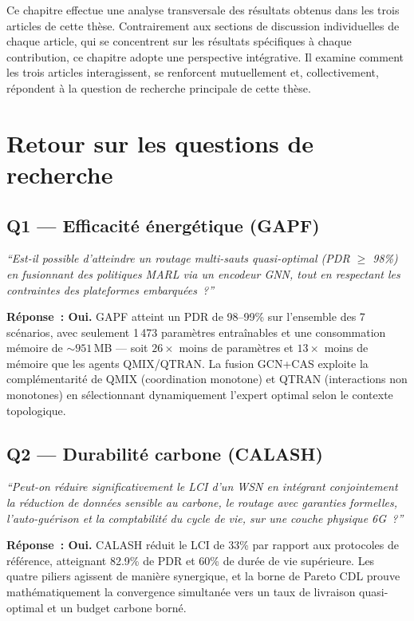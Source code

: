 \label{sec:Discussion}

Ce chapitre effectue une analyse transversale des résultats obtenus dans les trois articles de cette thèse. Contrairement aux sections de discussion individuelles de chaque article, qui se concentrent sur les résultats spécifiques à chaque contribution, ce chapitre adopte une perspective intégrative. Il examine comment les trois articles interagissent, se renforcent mutuellement et, collectivement, répondent à la question de recherche principale de cette thèse.


\section{Retour sur les questions de recherche}\label{sec:disc-retour-questions}

\subsection{Q1 --- Efficacité énergétique (GAPF)}

\noindent\textit{``Est-il possible d'atteindre un routage multi-sauts quasi-optimal (PDR $\geq$ 98\%) en fusionnant des politiques MARL via un encodeur GNN, tout en respectant les contraintes des plateformes embarquées~?''}

\medskip
\noindent\textbf{Réponse~: Oui.} GAPF atteint un PDR de 98--99\% sur l'ensemble des 7 scénarios, avec seulement 1\,473 paramètres entraînables et une consommation mémoire de ${\sim}951$\,MB --- soit $26\times$ moins de paramètres et $13\times$ moins de mémoire que les agents QMIX/QTRAN. La fusion GCN+CAS exploite la complémentarité de QMIX (coordination monotone) et QTRAN (interactions non monotones) en sélectionnant dynamiquement l'expert optimal selon le contexte topologique.

\subsection{Q2 --- Durabilité carbone (CALASH)}

\noindent\textit{``Peut-on réduire significativement le LCI d'un WSN en intégrant conjointement la réduction de données sensible au carbone, le routage avec garanties formelles, l'auto-guérison et la comptabilité du cycle de vie, sur une couche physique 6G~?''}

\medskip
\noindent\textbf{Réponse~: Oui.} CALASH réduit le LCI de 33\% par rapport aux protocoles de référence, atteignant 82.9\% de PDR et 60\% de durée de vie supérieure. Les quatre piliers agissent de manière synergique, et la borne de Pareto CDL prouve mathématiquement la convergence simultanée vers un taux de livraison quasi-optimal et un budget carbone borné.


